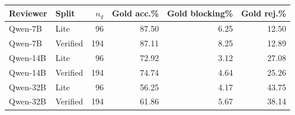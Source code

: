 \begin{tabular}{llrrrr}
\toprule
Reviewer & Split & $n_g$ & Gold acc.\% & Gold blocking\% & Gold rej.\% \\
\midrule
Qwen-7B & Lite & 96 & 87.50 & 6.25 & 12.50 \\
Qwen-7B & Verified & 194 & 87.11 & 8.25 & 12.89 \\
Qwen-14B & Lite & 96 & 72.92 & 3.12 & 27.08 \\
Qwen-14B & Verified & 194 & 74.74 & 4.64 & 25.26 \\
Qwen-32B & Lite & 96 & 56.25 & 4.17 & 43.75 \\
Qwen-32B & Verified & 194 & 61.86 & 5.67 & 38.14 \\
\bottomrule
\end{tabular}
